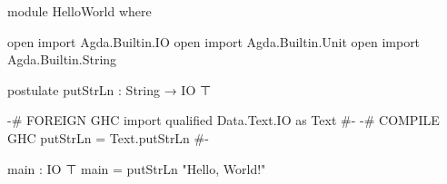 \documentclass{article}
\begin{document}
\begin{code}
module HelloWorld where

open import Agda.Builtin.IO
open import Agda.Builtin.Unit
open import Agda.Builtin.String

postulate
  putStrLn : String → IO ⊤

{-# FOREIGN GHC import qualified Data.Text.IO as Text #-}
{-# COMPILE GHC putStrLn = Text.putStrLn #-}

main : IO ⊤
main = putStrLn "Hello, World!"
\end{code}
\end{document}
